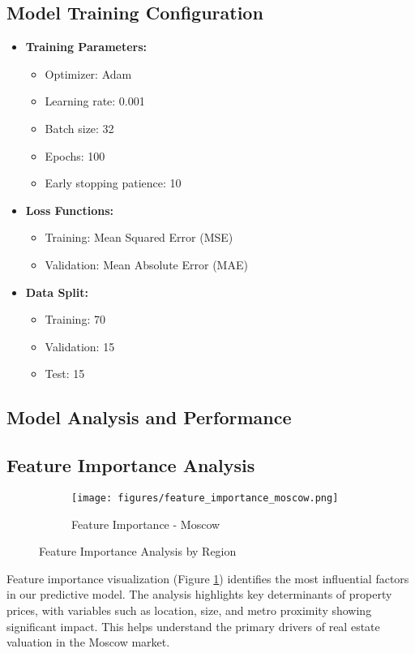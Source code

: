\documentclass[12pt,a4paper]{report}
\begin{document}
\subsection{Model Training Configuration}
\begin{itemize}
    \item \textbf{Training Parameters:}
    \begin{itemize}
        \item Optimizer: Adam
        \item Learning rate: 0.001
        \item Batch size: 32
        \item Epochs: 100
        \item Early stopping patience: 10
    \end{itemize}
    
    \item \textbf{Loss Functions:}
    \begin{itemize}
        \item Training: Mean Squared Error (MSE)
        \item Validation: Mean Absolute Error (MAE)
    \end{itemize}
    
    \item \textbf{Data Split:}
    \begin{itemize}
        \item Training: 70%
        \item Validation: 15%
        \item Test: 15%
    \end{itemize}
\end{itemize}
\subsection{Model Analysis and Performance}
\subsection{Feature Importance Analysis}

\begin{figure}[H]
\centering
\begin{subfigure}{0.45\textwidth}
    \texttt{[image: figures/feature\_importance\_moscow.png]}
    \caption{Feature Importance - Moscow}
\end{subfigure}
\caption{Feature Importance Analysis by Region}
\label{fig:feature_importance}
\end{figure}
Feature importance visualization (Figure \ref{fig:feature_importance}) identifies the most influential factors in our predictive model. The analysis highlights key determinants of property prices, with variables such as location, size, and metro proximity showing significant impact. This helps understand the primary drivers of real estate valuation in the Moscow market.
\end{document}
